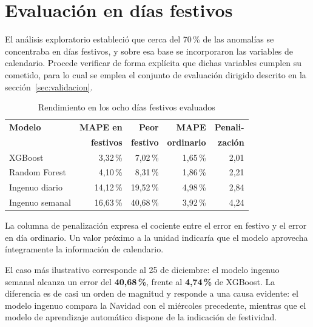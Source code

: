 
\section{Evaluación en días festivos}
\label{sec:festivos}

El análisis exploratorio estableció que cerca del 70\,\% de las anomalías se
concentraba en días festivos, y sobre esa base se incorporaron las variables de
calendario. Procede verificar de forma explícita que dichas variables cumplen su
cometido, para lo cual se emplea el conjunto de evaluación dirigido descrito en la
sección~\ref{sec:validacion}.

\begin{table}[H]
\centering
\caption{Rendimiento en los ocho días festivos evaluados}
\label{tab:festivos}
\begin{tabular}{|l|r|r|r|r|}
\hline
\rowcolor{grisclaro}
\textbf{Modelo} & \textbf{MAPE en} & \textbf{Peor} & \textbf{MAPE} &
\textbf{Penali-} \\
\rowcolor{grisclaro}
 & \textbf{festivos} & \textbf{festivo} & \textbf{ordinario} & \textbf{zación} \\
\hline
XGBoost         & 3,32\,\% & 7,02\,\% & 1,65\,\% & 2,01 \\
\hline
Random Forest   & 4,10\,\% & 8,31\,\% & 1,86\,\% & 2,21 \\
\hline
Ingenuo diario  & 14,12\,\% & 19,52\,\% & 4,98\,\% & 2,84 \\
\hline
Ingenuo semanal & 16,63\,\% & 40,68\,\% & 3,92\,\% & 4,24 \\
\hline
\end{tabular}
\end{table}

La columna de penalización expresa el cociente entre el error en festivo y el
error en día ordinario. Un valor próximo a la unidad indicaría que el modelo
aprovecha íntegramente la información de calendario.

El caso más ilustrativo corresponde al 25 de diciembre: el modelo ingenuo semanal
alcanza un error del \textbf{40,68\,\%}, frente al \textbf{4,74\,\%} de XGBoost.
La diferencia es de casi un orden de magnitud y responde a una causa evidente: el
modelo ingenuo compara la Navidad con el miércoles precedente, mientras que el
modelo de aprendizaje automático dispone de la indicación de festividad.

